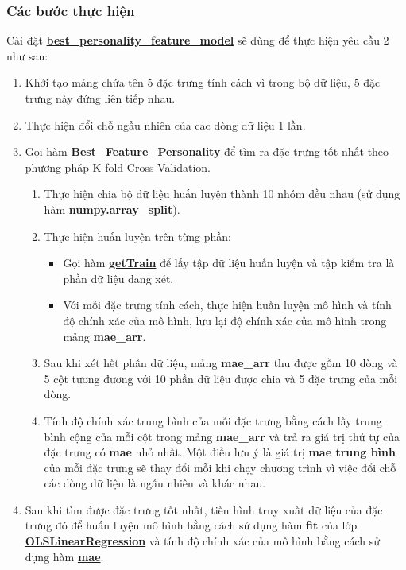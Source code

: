 \documentclass{report}
\begin{document}
        \subsubsection{Các bước thực hiện}
        Cài đặt \hyperref[sec:bestpersonalityfeaturemodel]{\textbf{best\_personality\_feature\_model}} sẽ dùng để thực hiện yêu cầu 2 như sau:
            \begin{enumerate}
                \item Khởi tạo mảng chứa tên 5 đặc trưng tính cách vì trong bộ dữ liệu, 5 đặc trưng này đứng liên tiếp nhau.
                \item Thực hiện đổi chỗ ngẫu nhiên của cac dòng dữ liệu 1 lần.
                \item Gọi hàm \hyperref[sec:BestFeaturePersonality]{\textbf{Best\_Feature\_Personality}}  để tìm ra đặc trưng tốt nhất theo phương pháp \hyperref[sec:k-fold-cross-validation]{K-fold Cross Validation}.
                \begin{enumerate}
                    \item Thực hiện chia bộ dữ liệu huấn luyện thành 10 nhóm đều nhau (sử dụng hàm \textbf{numpy.array\_split}).
                    \item Thực hiện huấn luyện trên từng phần:
                        \begin{itemize}
                            \item Gọi hàm \hyperref[sec:getTrain]{\textbf{getTrain}} để lấy tập dữ liệu huấn luyện và tập kiểm tra là phần dữ liệu đang xét.
                            \item Với mỗi đặc trưng tính cách, thực hiện huấn luyện mô hình và tính độ chính xác của mô hình, lưu lại độ chính xác của mô hình trong mảng \textbf{mae\_arr}.
                        \end{itemize}
                    \item Sau khi xét hết phần dữ liệu, mảng \textbf{mae\_arr} thu được gồm 10 dòng và 5 cột tương đương với 10 phần dữ liệu được chia và 5 đặc trưng của mỗi dòng.
                    \item Tính độ chính xác trung bình của mỗi đặc trưng bằng cách lấy trung bình cộng của mỗi cột trong mảng \textbf{mae\_arr} và trả ra giá trị thứ tự của đặc trưng có \textbf{mae} nhỏ nhất. Một điều lưu ý là giá trị \textbf{mae trung bình} của mỗi đặc trưng sẽ thay đổi mỗi khi chạy chương trình vì việc đổi chỗ các dòng dữ liệu là ngẫu nhiên và khác nhau. 
                \end{enumerate}
                \item Sau khi tìm được đặc trưng tốt nhất, tiến hình truy xuất dữ liệu của đặc trưng đó để huấn luyện mô hình bằng cách sử dụng hàm \textbf{fit} của lớp \hyperref[sec:olslinearregression]{\textbf{OLSLinearRegression}}  và tính độ chính xác của mô hình bằng cách sử dụng hàm \hyperref[sec:mae]{\textbf{mae}}.
            \end{enumerate}
        
\end{document}
